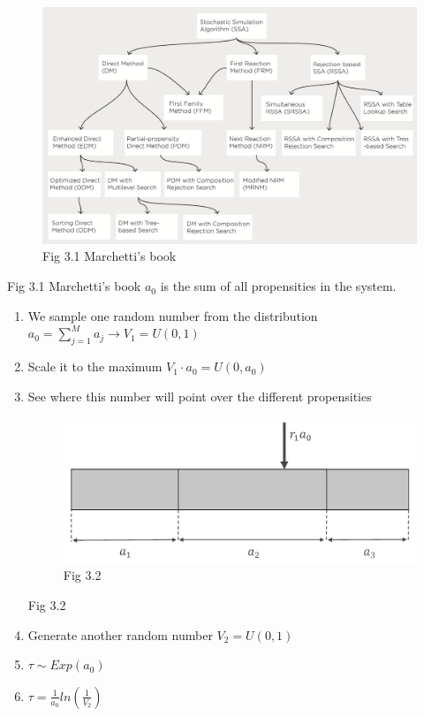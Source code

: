 \begin{figure}
  \centering
  \includegraphics{tree_methods.png}
  \caption{Fig 3.1 Marchetti's book}
\end{figure}

Fig 3.1 Marchetti's book $a_0$ is the sum of all propensities in the system.

\begin{enumerate}
  \def\labelenumi{\arabic{enumi}.}
  \item We sample one random number from the distribution $a_0 = \sum_{j=1}^{M}{a_j}\rightarrow V_1=U(0,1)$
  \item Scale it to the maximum $V_1 \cdot a_0 =U(0,a_0)$
  \item See where this number will point over the different propensities

  \begin{figure}
    \centering
    \includegraphics{boundaries.png}
    \caption{Fig 3.2}
  \end{figure}

    Fig 3.2
  \item Generate another random number $V_2 =U(0,1)$ \item $\tau \sim Exp(a_0)$ \item $\tau = \frac{1}{a_0}ln(\frac{1}{V_2})$
\end{enumerate}

